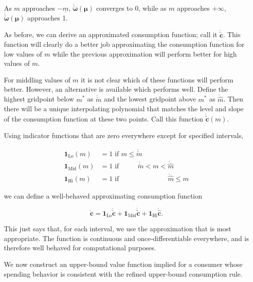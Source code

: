 \documentclass[preprint,authoryear]{elsarticle}
\newcommand{\mNrm}{m}
\newcommand{\cFunc}{\mathbf{c}}
\newcommand{\cFuncApprox}{\grave{\cFunc}}
\newcommand{\mNrmMin}{\underline{\mNrm}}
\newcommand{\logmNrmEx}{\boldsymbol{\mu}}
\newcommand{\modRte}{\boldsymbol{\omega}}
\newcommand{\mNrmCusp}{\mNrm^*}
\newcommand{\modRteLoTightUpBd}{\grave{\check{\modRte}}}
\newcommand{\cFuncLoTightUpBd}{\grave{\check{\cFunc}}}
\newcommand{\mNrmLoTightUpBd}{\grave{\check{\mNrm}}}
\newcommand{\mNrmHiTightUpBd}{\grave{\hat{\mNrm}}}
\newcommand{\cFuncMidTightUpBd}{\grave{\tilde{\cFunc}}}
\newcommand{\indLo}{\mathbf{1}_{\text{Lo}}}
\newcommand{\indMid}{\mathbf{1}_{\text{Mid}}}
\newcommand{\indHi}{\mathbf{1}_{\text{Hi}}}
\newcommand{\cFuncHiTightUpBd}{\grave{\hat{\cFunc}}}
\begin{document}
As $\mNrm$ approaches $-\mNrmMin$, $\modRteLoTightUpBd(\logmNrmEx)$
converges to 0, while as $\mNrm$ approaches $+\infty$,
$\modRteLoTightUpBd(\logmNrmEx)$ approaches 1.

As before, we can derive an approximated consumption function; call it
$\cFuncLoTightUpBd$. This function will clearly do a better job approximating
the consumption function for low values of $\mNrm$ while the previous
approximation will perform better for high values of $\mNrm$.

For middling values of $\mNrm$ it is not clear which of these functions will
perform better. However, an alternative is available which performs well. Define
the highest gridpoint below $\mNrmCusp$ as $\mNrmLoTightUpBd$ and the lowest
gridpoint above $\mNrmCusp$ as $\mNrmHiTightUpBd$. Then there will be a unique
interpolating polynomial that matches the level and slope of the consumption
function at these two points. Call this function $\cFuncMidTightUpBd(\mNrm)$.

Using indicator functions that are zero everywhere except for specified
intervals,

\begin{equation}
\begin{aligned}
\indLo(\mNrm)  &= 1 \text{~if $\mNrm \leq \mNrmLoTightUpBd \phantom{< \mNrm < \mNrmHiTightUpBd \leq \mNrm}$} \\
\indMid(\mNrm) &= 1 \text{~if $\phantom{\mNrm \leq}~ \mNrmLoTightUpBd < \mNrm < \mNrmHiTightUpBd \phantom{\leq \mNrm}$} \\
\indHi(\mNrm)  &= 1 \text{~if $\phantom{\mNrm \leq ~\mNrmLoTightUpBd < \mNrm <} \mNrmHiTightUpBd \leq \mNrm$}
\end{aligned}
\end{equation}

we can define a well-behaved approximating consumption function

\begin{equation}
\cFuncApprox = \indLo \cFuncLoTightUpBd + \indMid \cFuncMidTightUpBd+\indHi \cFuncHiTightUpBd.
\end{equation}

This just says that, for each interval, we use the approximation that is most
appropriate. The function is continuous and once-differentiable everywhere, and
is therefore well behaved for computational purposes.

We now construct an upper-bound value function implied for a consumer whose
spending behavior is consistent with the refined upper-bound consumption rule.
\end{document}
